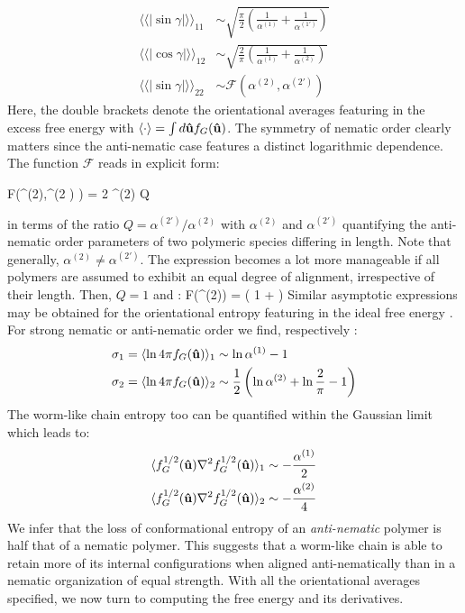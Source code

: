 \begin{align}
\langle \langle | \sin \gamma | \rangle \rangle_{11} & \sim \sqrt{ \frac{\pi}{2} \left ( \frac{1}{\alpha^{(1)}} + \frac{1}{\alpha^{(1\prime)}} \right ) } \nonumber \\  
    \langle \langle | \cos \gamma | \rangle \rangle_{12} & \sim  \sqrt{ \frac{2}{\pi} \left ( \frac{1}{\alpha^{(1)}} + \frac{1}{\alpha^{(2)}} \right ) } \nonumber \\ 
    \langle \langle | \sin \gamma | \rangle \rangle_{22} & \sim \mathcal{F} (\alpha^{(2)}, \alpha^{(2\prime)})
    \label{sinav}
\end{align}
Here,  the double brackets denote the orientational averages featuring in the excess free energy  with $ \langle \cdot \rangle = \int d {\bf \hat{u}} f_{G} ({\bf \hat{u}}) $. The symmetry of nematic order clearly matters since the anti-nematic case features a distinct logarithmic dependence. The function ${\mathcal F}$ reads in explicit form:

\beq
 {\mathcal F}(\alpha^{(2)},\alpha^{(2 \prime)} ) =  {2 \pi \alpha^{(2)} Q}
\eeq

in terms of the ratio $Q=  \alpha^{(2\prime)}/ \alpha^{(2)}$ with $\alpha^{(2)}$ and $\alpha^{(2\prime)}$ quantifying the anti-nematic order parameters of two polymeric species differing in length. Note that generally, $\alpha^{(2)} \neq \alpha^{(2\prime)}$. The expression becomes a lot more manageable if all polymers are assumed to exhibit an equal degree of alignment, irrespective of their length. Then, $Q=1$ and \cite{wensink2001}:
\beq
{\mathcal F}(\alpha^{(2)})  =   \left ( 1 +  \right )
\eeq
Similar asymptotic expressions may be obtained for the orientational entropy featuring in the ideal free energy . For strong nematic or anti-nematic order we find, respectively \cite{wensinkrodplate}:
\begin{align}
\sigma_{1} = \langle \ln 4 \pi f_{G} ({\bf \hat{u}}) \rangle_{1} &\sim \ln \alpha^{(1)} -1  \nonumber \\
\sigma_{2} =\langle \ln 4 \pi f_{G} ({\bf \hat{u}}) \rangle_{2}   &\sim \frac{1}{2} \left ( \ln \alpha^{(2)} + \ln \frac{2}{\pi} -1 \right )  
\label{sigma12}
\end{align}
The worm-like chain entropy  too can be quantified within the Gaussian limit which leads to:
\begin{align}
\langle  f_{G}^{1/2} ({\bf \hat{u}}) \nabla^{2} f_{G}^{1/2} ({\bf \hat{u}})  \rangle_{1} & \sim -\frac{\alpha^{(1)}}{2} \nonumber \\ 
\langle  f_{G}^{1/2} ({\bf \hat{u}}) \nabla^{2}  f_{G}^{1/2} ({\bf \hat{u}})  \rangle_{2} & \sim  
-\frac{\alpha^{(2)}}{4} 
\end{align}
We infer that the loss of conformational entropy of an {\em anti-nematic} polymer is half that of a nematic polymer. This suggests that a worm-like chain is able to retain more of its internal configurations when aligned anti-nematically than in a nematic organization of equal strength. With all the orientational averages specified, we  now turn to computing the free energy and its derivatives. 



